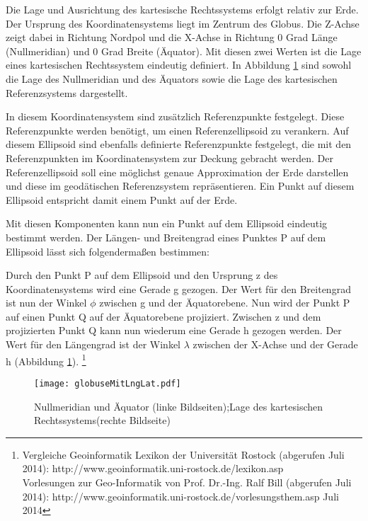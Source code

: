 			Die Lage und Ausrichtung des kartesische Rechtssystems erfolgt relativ zur Erde. 
			Der Ursprung des Koordinatensystems liegt im Zentrum des Globus.
			Die Z-Achse zeigt dabei in Richtung Nordpol und die X-Achse in Richtung 0 Grad Länge (Nullmeridian) und 0 Grad Breite (Äquator). 
			Mit diesen zwei Werten ist die Lage eines kartesischen Rechtssystem eindeutig definiert.
			In Abbildung \ref{img:lnglat} sind sowohl die Lage des Nullmeridian und des Äquators sowie die Lage des kartesischen Referenzsystems dargestellt. 

			In diesem Koordinatensystem sind zusätzlich Referenzpunkte festgelegt.
			Diese Referenzpunkte werden benötigt, um einen Referenzellipsoid zu verankern. 
			Auf diesem Ellipsoid sind ebenfalls definierte Referenzpunkte festgelegt, die mit den Referenzpunkten im Koordinatensystem zur Deckung gebracht werden.
			Der Referenzellipsoid soll eine möglichst genaue Approximation der Erde darstellen und diese im geodätischen Referenzsystem repräsentieren. 
			Ein Punkt auf diesem Ellipsoid entspricht damit einem Punkt auf der Erde.

			Mit diesen Komponenten kann nun ein Punkt auf dem Ellipsoid eindeutig bestimmt werden.
			Der Längen- und Breitengrad eines Punktes P auf dem Ellipsoid lässt sich folgendermaßen bestimmen:

			Durch den Punkt P auf dem Ellipsoid und den Ursprung z des Koordinatensystems wird eine Gerade g gezogen. 
			Der Wert für den Breitengrad ist nun der Winkel $\phi$ zwischen g und der Äquatorebene.
			Nun wird der Punkt P auf einen Punkt Q auf der Äquatorebene projiziert.
			Zwischen z und dem projizierten Punkt Q kann nun wiederum eine Gerade h gezogen werden.
			Der Wert für den Längengrad ist der Winkel $\lambda$ zwischen der X-Achse und der Gerade h (Abbildung \ref{img:lnglat}).
			\footnote{Vergleiche Geoinformatik Lexikon der Universität Rostock (abgerufen Juli 2014): http://www.geoinformatik.uni-rostock.de/lexikon.asp \\ Vorlesungen zur Geo-Informatik von Prof. Dr.-Ing. Ralf Bill (abgerufen Juli 2014): http://www.geoinformatik.uni-rostock.de/vorlesungsthem.asp \label{ft:geoinfolex}  Juli 2014}



			\begin{figure}[h!]
			\begin{center}
				\texttt{[image: globuseMitLngLat.pdf]}
				\caption{Nullmeridian und Äquator (linke Bildseiten);Lage des kartesischen Rechtssystems(rechte Bildseite)}
				\label{img:lnglat}
			\end{center}
			\end{figure}	

